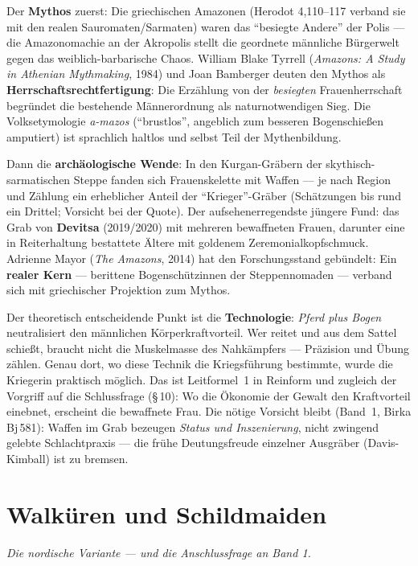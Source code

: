 \documentclass[11pt,a4paper,ngerman]{scrartcl}
\newcommand{\chipbase}[2]{\hspace{0pt}{\footnotesize\textcolor{#1}{[\textsc{#2}]}}}
\newcommand{\chipbelegt}[1]{\chipbase{chipgreen}{#1}}
\newcommand{\chipplausibel}[1]{\chipbase{chipamber}{#1}}
\newcommand{\chipumstritten}[1]{\chipbase{chipred}{#1}}
\begin{document}
Der \textbf{Mythos} zuerst: Die griechischen Amazonen (Herodot 4,110--117 verband sie mit den realen Sauromaten/Sarmaten) waren das \enquote{besiegte Andere} der Polis --- die Amazonomachie an der Akropolis stellt die geordnete männliche Bürgerwelt gegen das weiblich-barbarische Chaos. William Blake Tyrrell (\emph{Amazons: A Study in Athenian Mythmaking}, 1984) und Joan Bamberger deuten den Mythos als \textbf{Herrschaftsrechtfertigung}: Die Erzählung von der \emph{besiegten} Frauenherrschaft begründet die bestehende Männerordnung als naturnotwendigen Sieg. \chipplausibel{plausibel} Die Volksetymologie \emph{a-mazos} (\enquote{brustlos}, angeblich zum besseren Bogenschießen amputiert) ist sprachlich haltlos und selbst Teil der Mythenbildung. \chipbelegt{belegt}

Dann die \textbf{archäologische Wende}: In den Kurgan-Gräbern der skythisch-sarmatischen Steppe fanden sich Frauenskelette mit Waffen --- je nach Region und Zählung ein erheblicher Anteil der \enquote{Krieger}-Gräber (Schätzungen bis rund ein Drittel; Vorsicht bei der Quote). Der aufsehenerregendste jüngere Fund: das Grab von \textbf{Devitsa} (2019/2020) mit mehreren bewaffneten Frauen, darunter eine in Reiterhaltung bestattete Ältere mit goldenem Zeremonialkopfschmuck. Adrienne Mayor (\emph{The Amazons}, 2014) hat den Forschungsstand gebündelt: Ein \textbf{realer Kern} --- berittene Bogenschützinnen der Steppennomaden --- verband sich mit griechischer Projektion zum Mythos. \chipbelegt{belegt}

Der theoretisch entscheidende Punkt ist die \textbf{Technologie}: \emph{Pferd plus Bogen} neutralisiert den männlichen Körperkraftvorteil. Wer reitet und aus dem Sattel schießt, braucht nicht die Muskelmasse des Nahkämpfers --- Präzision und Übung zählen. Genau dort, wo diese Technik die Kriegsführung bestimmte, wurde die Kriegerin praktisch möglich. \chipplausibel{plausibel} Das ist Leitformel~1 in Reinform und zugleich der Vorgriff auf die Schlussfrage (§\,10): Wo die Ökonomie der Gewalt den Kraftvorteil einebnet, erscheint die bewaffnete Frau. Die nötige Vorsicht bleibt (Band~1, Birka Bj\,581): Waffen im Grab bezeugen \emph{Status und Inszenierung}, nicht zwingend gelebte Schlachtpraxis --- die frühe Deutungsfreude einzelner Ausgräber (Davis-Kimball) ist zu bremsen. \chipumstritten{umstritten}

\section{Walküren und Schildmaiden}
\noindent\textit{Die nordische Variante --- und die Anschlussfrage an Band 1.}
\medskip
\end{document}
